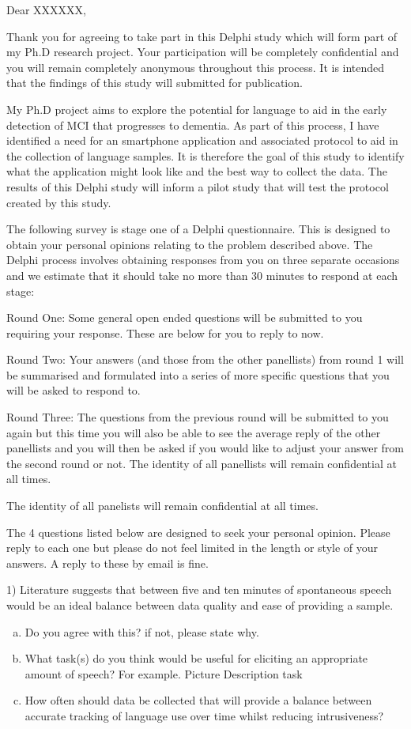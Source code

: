 \documentclass{letter}
\begin{document}
Dear XXXXXX, 

Thank you for agreeing to take part in this Delphi study which will form part of my Ph.D research project. Your participation will be completely confidential and you will remain completely anonymous throughout this process. It is intended that the findings of this study will submitted for publication. 

My Ph.D project aims to explore the potential for language to aid in the early detection of MCI that progresses to dementia. As part of this process, I have identified a need for an smartphone application and associated protocol to aid in the collection of language samples. It is therefore the goal of this study to identify what the application might look like and the best way to collect the data. The results of this Delphi study will inform a pilot study that will test the protocol created by this study.

The following survey is stage one of a Delphi questionnaire. This is designed to obtain your personal opinions relating to the problem described above. The Delphi process involves obtaining responses from you on three separate occasions and we estimate that it should take no more than 30 minutes to respond at each stage:

Round One: Some general open ended questions will be submitted to you requiring your response. These are below for you to reply to now. 

Round Two: Your answers (and those from the other panellists) from round 1 will be summarised and formulated into a series of more specific questions that you will be asked to respond to.

Round Three: The questions from the previous round will be submitted to you again but this time you will also be able to see the average reply of the other panellists and you will then be asked if you would like to adjust your answer from the second round or not. The identity of all panellists will remain confidential at all times.


The identity of all panelists will remain confidential at all times.

The 4 questions listed below are designed to seek your personal opinion. Please reply to each one but please do not feel limited in the length or style of your answers. A reply to these by email is fine.
\par
\itshape

1) Literature suggests that between five and ten minutes of spontaneous speech would be an ideal balance between data quality and ease of providing a sample. 
\begin{enumerate}[(a)]
	\item Do you agree with this? if not, please state why.
	\item What task(s) do you think would be useful for eliciting an appropriate amount of speech? For example. Picture Description task
	\item How often should data be collected that will provide a balance between accurate tracking of language use over time whilst reducing intrusiveness?
\end{enumerate}
	
\end{document}

